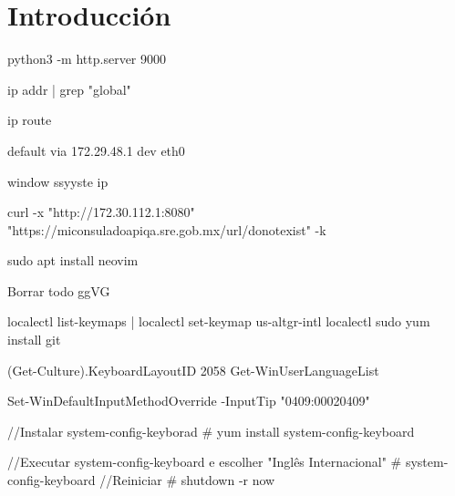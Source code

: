 


\section{Introducción}



python3 -m http.server 9000

ip addr | grep "global"

ip route 

default via 172.29.48.1 dev eth0


window ssyyste ip 

curl -x "http://172.30.112.1:8080" "https://miconsuladoapiqa.sre.gob.mx/url/donotexist" -k


sudo apt install neovim


Borrar todo
ggVG






localectl list-keymaps |
localectl set-keymap us-altgr-intl
localectl 
sudo yum install git


(Get-Culture).KeyboardLayoutID
2058
Get-WinUserLanguageList



Set-WinDefaultInputMethodOverride -InputTip "0409:00020409"




//Instalar system-config-keyborad
# yum install system-config-keyboard
 
//Executar system-config-keyboard e escolher "Inglês Internacional"
# system-config-keyboard
//Reiniciar
# shutdown -r now